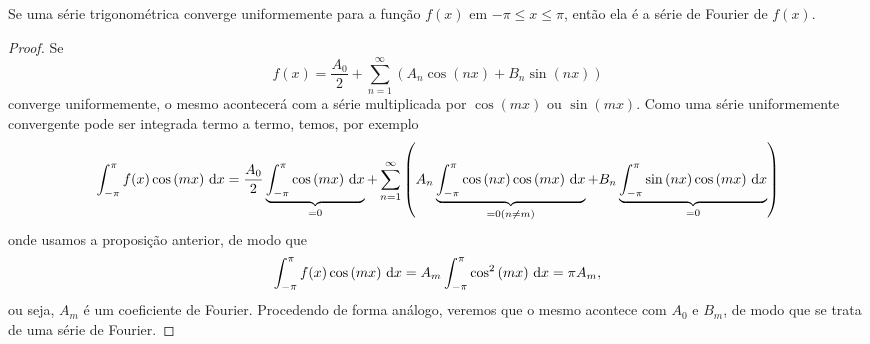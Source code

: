 \begin{teo}
  Se uma série trigonométrica converge uniformemente para a função $f(x)$ em
  $-\pi \leq x \leq \pi$, então ela é a série de Fourier de $f(x)$.
\end{teo}
\begin{proof}
  Se
  \begin{dmath*}
    f(x) = \frac{A_0}{2} + \sum_{n = 1}^\infty \left( A_n \cos\left( n x \right)
    + B_n \sin\left( n x \right) \right)
  \end{dmath*}
  converge uniformemente, o mesmo acontecerá com a série multiplicada por
  $\cos\left( m x \right)$ ou $\sin\left( m x \right)$. Como uma série
  uniformemente convergente pode ser integrada termo a termo, temos, por exemplo
  \begin{dmath*}
      \int_{-\pi}^\pi f(x) \cos\left( m x \right) \vi{x} = \frac{A_0}{2}
      \underbrace{\int_{-\pi}^\pi \cos\left( m x \right) \vi{x}}_{= 0} + \sum_{n
      = 1}^\infty \left( A_n \underbrace{\int_{-\pi}^\pi \cos\left( n x \right)
      \cos\left( m x \right) \vi{x}}_{= 0 (n \neq m)} + B_n
      \underbrace{\int_{-\pi}^\pi \sin\left( n x \right) \cos\left( m x \right)
      \vi{x}}_{= 0} \right)
  \end{dmath*}
  onde usamos a proposição anterior, de modo que
  \begin{dmath*}
    \int_{-\pi}^\pi f(x) \cos\left( m x \right) \vi{x} = A_m \int_{-\pi}^\pi
    \cos^2\left( m x \right) \vi{x} = \pi A_m,
  \end{dmath*}
  ou seja, $A_m$ é um coeficiente de Fourier. Procedendo de forma análogo,
  veremos que o mesmo acontece com $A_0$ e $B_m$, de modo que se trata de uma
  série de Fourier.
\end{proof}

